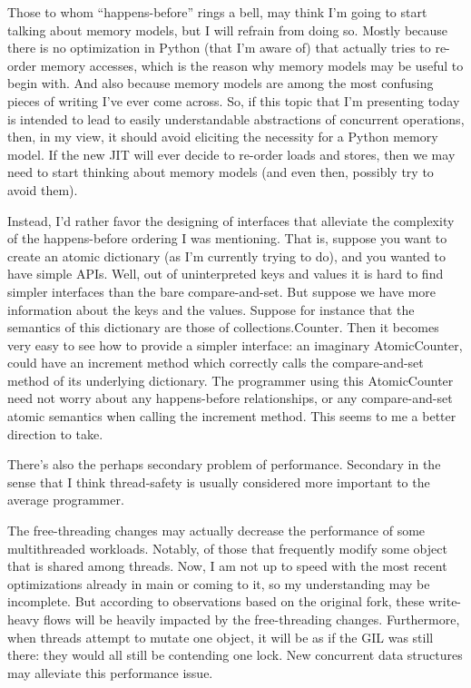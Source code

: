 Those to whom ``happens-before'' rings a bell, may think I'm going to start talking about memory models, but I will refrain from doing so.
Mostly because there is no optimization in Python (that I'm aware of) that actually tries to re-order memory accesses, which is the reason why memory models may be useful to begin with.
And also because memory models are among the most confusing pieces of writing I've ever come across.
So, if this topic that I'm presenting today is intended to lead to easily understandable abstractions of concurrent operations, then, in my view, it should avoid eliciting the necessity for a Python memory model.
If the new JIT will ever decide to re-order loads and stores, then we may need to start thinking about memory models (and even then, possibly try to avoid them).

Instead, I'd rather favor the designing of interfaces that alleviate the complexity of the happens-before ordering I was mentioning.
That is, suppose you want to create an atomic dictionary (as I'm currently trying to do), and you wanted to have simple APIs.
Well, out of uninterpreted keys and values it is hard to find simpler interfaces than the bare compare-and-set.
But suppose we have more information about the keys and the values.
Suppose for instance that the semantics of this dictionary are those of collections.Counter.
Then it becomes very easy to see how to provide a simpler interface: an imaginary AtomicCounter, could have an increment method which correctly calls the compare-and-set method of its underlying dictionary.
The programmer using this AtomicCounter need not worry about any happens-before relationships, or any compare-and-set atomic semantics when calling the increment method.
This seems to me a better direction to take.

There's also the perhaps secondary problem of performance.
Secondary in the sense that I think thread-safety is usually considered more important to the average programmer.

 The free-threading changes may actually decrease the performance of some multithreaded workloads.
Notably, of those that frequently modify some object that is shared among threads.
Now, I am not up to speed with the most recent optimizations already in main or coming to it, so my understanding may be incomplete.
But according to observations based on the original fork, these write-heavy flows will be heavily impacted by the free-threading changes.
Furthermore, when threads attempt to mutate one object, it will be as if the GIL was still there: they would all still be contending one lock.
New concurrent data structures may alleviate this performance issue.

